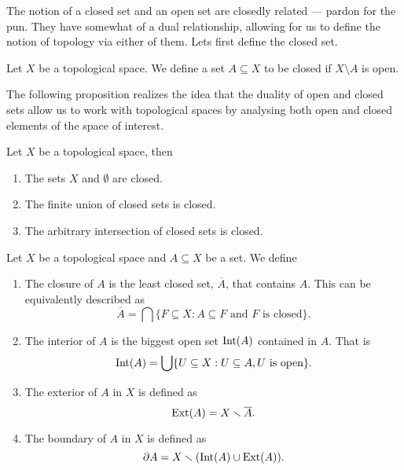 The notion of a closed set and an open set are closedly related --- pardon for the
pun. They have somewhat of a dual relationship, allowing for us to define the
notion of topology via either of them. Lets first define the closed set.

\begin{definition}
Let \(X\) be a topological space. We define a set \(A \subseteq X\) to be
closed if \(X \setminus A\) is open.
\end{definition}

The following proposition realizes the idea that the duality of open and closed
sets allow us to work with topological spaces by analysing both open and closed
elements of the space of interest.

\begin{proposition}
Let \(X\) be a topological space, then
\begin{enumerate}\setlength\itemsep{0em}
  \item The sets \(X\) and \(\emptyset\) are closed.
  \item The finite union of closed sets is closed.
  \item The arbitrary intersection of closed sets is closed.
\end{enumerate}
\end{proposition}

\begin{definition}[Miscelaneous]
Let \(X\) be a topological space and \(A \subseteq X\) be a set. We define
\begin{enumerate}\setlength\itemsep{0em}
  \item\label{def: closure}
    The closure of \(A\) is the least closed set, \(\overline A\), that
    contains \(A\). This can be equivalently described as
    \[
      \overline A = \bigcap \{F \subseteq X : A \subseteq F \text{ and } F
      \text{ is closed}\}.
    \]
  \item\label{def: interior}
    The interior of \(A\) is the biggest open set \(\operatorname{Int}(A)\) contained in
    \(A\). That is
      \[
        \operatorname{Int}(A) = \bigcup \{U \subseteq X : U \subseteq A, U \text{ is open}\}.
    \]
  \item\label{def: exterior}
    The exterior of \(A\) in \(X\) is defined as
    \[
      \operatorname{Ext}(A) = X \smallsetminus \overline A.
    \]
  \item\label{def: boundary}
    The boundary of \(A\) in \(X\) is defined as
    \[
      \partial A = X \smallsetminus (\operatorname{Int}(A) \cup \operatorname{Ext}(A)).
    \]
\end{enumerate}
\end{definition}

